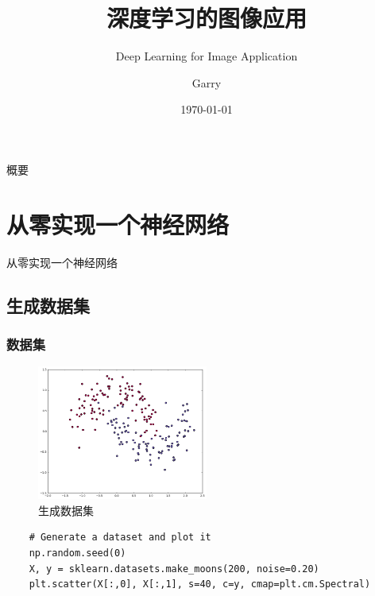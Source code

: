 \documentclass[table]{beamer}
\title{深度学习的图像应用}
\subtitle{Deep Learning for Image Application}
\author{Garry}
\institute{大数据部门}
\date{\today}
\begin{document}
\frame{\titlepage}
\begin{frame}{概要}
	\tableofcontents
\end{frame}
\section{从零实现一个神经网络}
\begin{frame}
	\begin{center}
		\vspace{0.1cm}
		\Huge{从零实现一个神经网络}
	\end{center}
\end{frame}
\subsection{生成数据集}
\begin{frame}[fragile]
	\frametitle{数据集}
	\begin{figure}
		\includegraphics[width=0.5\textwidth]{generate_dataset.png}
		\caption{生成数据集}
		\label{fig:dataset}
	\end{figure}
  \begin{center}
    \begin{minipage}{0.8\textwidth}
    \begin{verbatim}
    # Generate a dataset and plot it
    np.random.seed(0)
    X, y = sklearn.datasets.make_moons(200, noise=0.20)
    plt.scatter(X[:,0], X[:,1], s=40, c=y, cmap=plt.cm.Spectral)
    \end{verbatim}
    \end{minipage}
  \end{center}
\end{frame}
\end{document}
